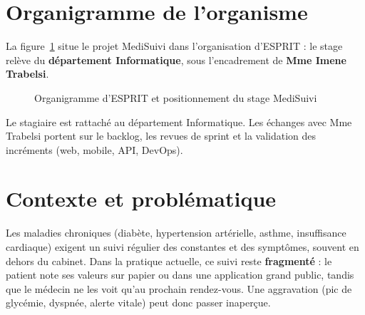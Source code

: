 \documentclass[12pt,a4paper,oneside]{report}
\begin{document}
\section{Organigramme de l'organisme}

La figure~\ref{fig:organigramme} situe le projet MediSuivi dans l'organisation d'ESPRIT : le stage relève du \textbf{département Informatique}, sous l'encadrement de \textbf{Mme Imene Trabelsi}.

\begin{figure}[htbp]
\centering
{}
\caption{Organigramme d'ESPRIT et positionnement du stage MediSuivi}
\label{fig:organigramme}
\end{figure}

Le stagiaire est rattaché au département Informatique. Les échanges avec Mme Trabelsi portent sur le backlog, les revues de sprint et la validation des incréments (web, mobile, API, DevOps).

\section{Contexte et problématique}

Les maladies chroniques (diabète, hypertension artérielle, asthme, insuffisance cardiaque) exigent un suivi régulier des constantes et des symptômes, souvent en dehors du cabinet. Dans la pratique actuelle, ce suivi reste \textbf{fragmenté} : le patient note ses valeurs sur papier ou dans une application grand public, tandis que le médecin ne les voit qu'au prochain rendez-vous. Une aggravation (pic de glycémie, dyspnée, alerte vitale) peut donc passer inaperçue.
\end{document}
